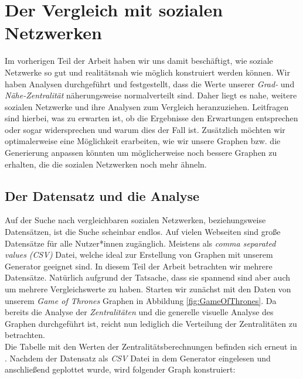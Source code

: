 \chapter{Der Vergleich mit sozialen Netzwerken}\label{ch:vergleich}

Im vorherigen Teil der Arbeit haben wir uns damit beschäftigt, wie soziale Netzwerke so gut und realitätsnah wie möglich konstruiert werden können. Wir haben Analysen durchgeführt und festgestellt, dass die Werte unserer \textit{Grad-} und \textit{Nähe-Zentralität} näherungsweise normalverteilt sind. Daher liegt es nahe, weitere sozialen Netzwerke und ihre Analysen zum Vergleich heranzuziehen. Leitfragen sind hierbei, was zu erwarten ist, ob die Ergebnisse den Erwartungen entsprechen oder sogar widersprechen und warum dies der Fall ist. Zusätzlich möchten wir optimalerweise eine Möglichkeit erarbeiten, wie wir unsere Graphen bzw. die Generierung anpassen könnten um möglicherweise noch bessere Graphen zu erhalten, die die sozialen Netzwerken noch mehr ähneln. 

\section{Der Datensatz und die Analyse}
Auf der Suche nach vergleichbaren sozialen Netzwerken, beziehungsweise Datensätzen, ist die Suche scheinbar endlos. Auf vielen Webseiten sind große Datensätze für alle Nutzer*innen zugänglich. Meistens als \textit{comma separated values (CSV)} Datei, welche ideal zur Erstellung von Graphen mit unserem Generator geeignet sind. In diesem Teil der Arbeit betrachten wir mehrere Datensätze. Natürlich aufgrund der Tatsache, dass sie spannend sind aber auch um mehrere Vergleichswerte zu haben. Starten wir zunächst mit den Daten \cite{GOT} von unserem \textit{Game of Thrones} Graphen in Abbildung \ref{fig:GameOfThrones}. Da bereits die Analyse der \textit{Zentralitäten} und die generelle visuelle Analyse des Graphen durchgeführt ist, reicht nun lediglich die Verteilung der Zentralitäten zu betrachten.\\
Die Tabelle mit den Werten der Zentralitätsberechnungen befinden sich erneut in \cite{TZ}. Nachdem der Datensatz als \textit{CSV} Datei in dem Generator eingelesen und anschließend geplottet wurde, wird folgender Graph konstruiert:

